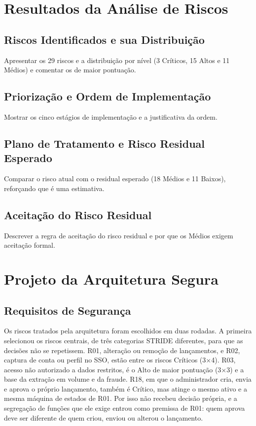 \documentclass[conference]{IEEEtran}
\begin{document}
\section{Resultados da Análise de Riscos}
\label{sec:resultados}
\subsection{Riscos Identificados e sua Distribuição}
Apresentar os 29 riscos e a distribuição por nível (3 Críticos, 15 Altos e 11 Médios) e comentar os de maior pontuação.
\subsection{Priorização e Ordem de Implementação}
Mostrar os cinco estágios de implementação e a justificativa da ordem.
\subsection{Plano de Tratamento e Risco Residual Esperado}
Comparar o risco atual com o residual esperado (18 Médios e 11 Baixos), reforçando que é uma estimativa.
\subsection{Aceitação do Risco Residual}
Descrever a regra de aceitação do risco residual e por que os Médios exigem aceitação formal.

\section{Projeto da Arquitetura Segura}
\label{sec:arquitetura}
\subsection{Requisitos de Segurança}
\label{subsec:requisitos}

Os riscos tratados pela arquitetura foram escolhidos em duas rodadas. A primeira selecionou os riscos centrais, de três categorias STRIDE diferentes, para que as decisões não se repetissem. R01, alteração ou remoção de lançamentos, e R02, captura de conta ou perfil no SSO, estão entre os riscos Críticos (3$\times$4). R03, acesso não autorizado a dados restritos, é o Alto de maior pontuação (3$\times$3) e a base da extração em volume e da fraude. R18, em que o administrador cria, envia e aprova o próprio lançamento, também é Crítico, mas atinge o mesmo ativo e a mesma máquina de estados de R01. Por isso não recebeu decisão própria, e a segregação de funções que ele exige entrou como premissa de R01: quem aprova deve ser diferente de quem criou, enviou ou alterou o lançamento.
\end{document}
